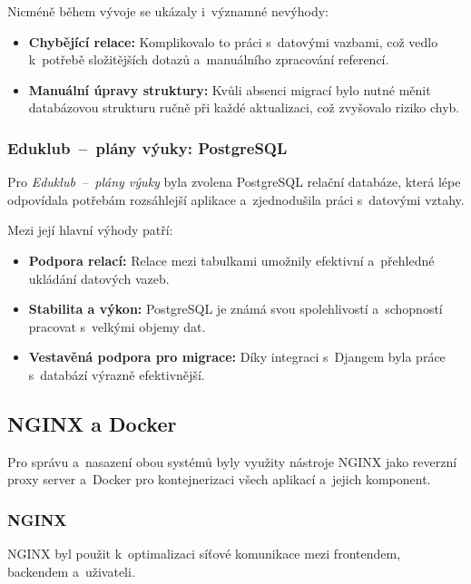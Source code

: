 \documentclass[male,czech,api_bc]{kitheses}
\begin{document}
Nicméně během vývoje se ukázaly i~významné nevýhody:
\begin{itemize}
	\item \textbf{Chybějící relace:} Komplikovalo to práci s~datovými vazbami, což vedlo k~potřebě složitějších dotazů a~manuálního zpracování referencí.
	\item \textbf{Manuální úpravy struktury:} Kvůli absenci migrací bylo nutné měnit databázovou strukturu ručně při každé aktualizaci, což zvyšovalo riziko chyb.
\end{itemize}

\subsubsection{Eduklub~--~plány výuky: PostgreSQL}

Pro \textit{Eduklub~--~plány výuky} byla zvolena PostgreSQL relační databáze, která lépe odpovídala potřebám rozsáhlejší aplikace a~zjednodušila práci s~datovými vztahy.

Mezi její hlavní výhody patří:
\begin{itemize}
	\item \textbf{Podpora relací:} Relace mezi tabulkami umožnily efektivní a~přehledné ukládání datových vazeb.
	\item \textbf{Stabilita a výkon:} PostgreSQL je známá svou spolehlivostí a~schopností pracovat s~velkými objemy dat.
	\item \textbf{Vestavěná podpora pro migrace:} Díky integraci s~Djangem byla práce s~databází výrazně efektivnější.
\end{itemize}

\subsection{NGINX a Docker}

Pro správu a~nasazení obou systémů byly využity nástroje NGINX jako reverzní proxy server a~Docker pro kontejnerizaci všech aplikací a~jejich komponent.

\subsubsection{NGINX}

NGINX byl použit k~optimalizaci síťové komunikace mezi frontendem, backendem a~uživateli.
\end{document}
